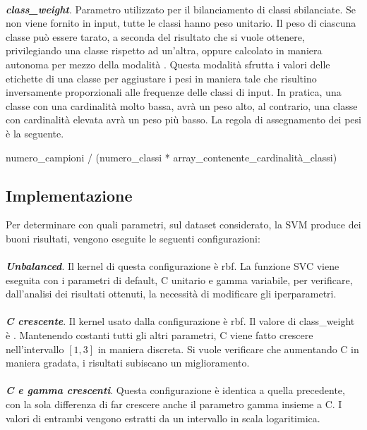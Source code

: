 \documentclass[12pt,a4paper,oneside,hidelinks]{report}
\begin{document}
\paragraph*{}
\textbf{\textit{class\_weight}}. Parametro utilizzato per il bilanciamento di classi sbilanciate. Se non viene fornito in input, tutte le classi hanno peso unitario. Il peso di ciascuna classe può essere tarato, a seconda del risultato che si vuole ottenere, privilegiando una classe rispetto ad un'altra, oppure calcolato in maniera autonoma per mezzo della modalità . 
Questa modalità sfrutta i valori delle etichette di una classe per aggiustare i pesi in maniera tale che risultino inversamente proporzionali alle frequenze delle classi di input. In pratica, una classe con una cardinalità molto bassa, avrà un peso alto, al contrario, una classe con cardinalità elevata avrà un peso più basso. La regola di assegnamento dei pesi è la seguente.

\begin{center}
numero\_campioni / (numero\_classi * array\_contenente\_cardinalità\_classi)
\end{center}

\subsection{Implementazione}
Per determinare con quali parametri, sul dataset considerato, la SVM produce dei buoni risultati, vengono eseguite le seguenti configurazioni:

\paragraph*{}
\textbf{\textit{Unbalanced}}. Il kernel di questa configurazione è rbf. La funzione SVC viene eseguita con i parametri di default, C unitario e gamma variabile, per verificare, dall'analisi dei risultati ottenuti, la necessità di modificare gli iperparametri.

\paragraph*{}
\textbf{\textit{C crescente}}. Il kernel usato dalla configurazione è rbf. Il valore di class\_weight è . Mantenendo costanti tutti gli altri parametri, C viene fatto crescere nell'intervallo $[1,3]$ in maniera discreta. Si vuole verificare che aumentando C in maniera gradata, i risultati subiscano un miglioramento.

\paragraph*{}
\textbf{\textit{C e gamma crescenti}}. Questa configurazione è identica a quella precedente, con la sola differenza di far crescere anche il parametro gamma insieme a C. I valori di entrambi vengono estratti da un intervallo in scala logaritimica.
\end{document}
